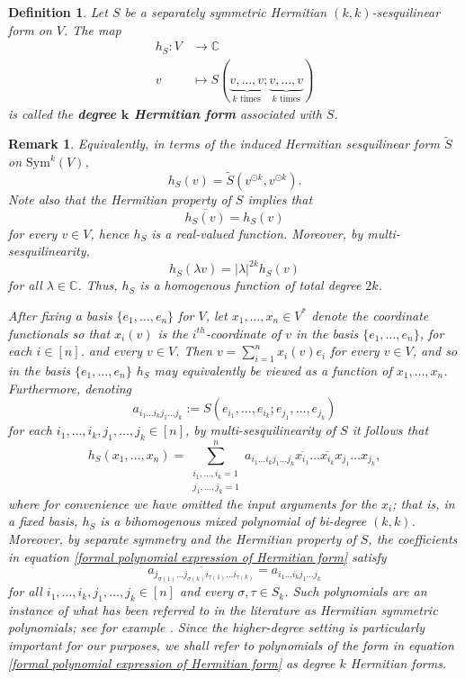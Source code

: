\documentclass[11pt]{article}
\newtheorem{defn}[theorem]{Definition}
\newtheorem{remark}[theorem]{Remark}
\begin{document}
\begin{defn}
    Let $S$ be a separately symmetric Hermitian $(k,k)$-sesquilinear form on $V$. The map 
    \begin{align*}
        h_S:V&\longrightarrow \mathbb{C} \\
        v&\mapsto S(\underbrace{v,\dots,v}_{k\text{ times}};\underbrace{v,\dots,v}_{k\text{ times}})
    \end{align*}
    is called the \textbf{degree $\boldsymbol{k}$ Hermitian form} associated with $S$. 
\end{defn}
\begin{remark}\label{Properties of Degree k Hermitian Forms}
    Equivalently, in terms of the induced Hermitian sesquilinear form $\widetilde{S}$ on $\mathrm{Sym}^k(V)$, 
    \[h_S(v) = \widetilde{S}(v^{\odot k},v^{\odot k}).\]
    Note also that the Hermitian property of $S$ implies that 
    \[\overline{h_S(v)} = h_S(v)\]
    for every $v\in V$, hence $h_S$ is a real-valued function. Moreover, by multi-sesquilinearity, 
    \[h_S(\lambda v) = |\lambda|^{2k}h_S(v)\]
    for all $\lambda\in \mathbb{C}$. Thus, $h_S$ is a homogenous function of total degree $2k$. 

    After fixing a basis $\{e_1,\dots,e_n\}$ for $V$, let $x_1,\dots,x_n\in V^*$ denote the coordinate functionals so that $x_i(v)$ is the $i^{th}$-coordinate of $v$ in the basis $\{e_1,\dots,e_n\}$, for each $i\in [n]$. and every $v\in V$. Then $v = \sum\limits_{i=1}^nx_i(v)e_i$ for every $v\in V$, and so in the basis $\{e_1,\dots,e_n\}$ $h_S$ may equivalently be viewed as a function of $x_1,\dots,x_n$. Furthermore, denoting
    \[a_{i_1\dots i_k j_1\dots j_k} := S(e_{i_1},\dots,e_{i_k};e_{j_1},\dots,e_{j_k})\]
    for each $i_1,\dots,i_k,j_1,\dots,j_k\in [n]$, by multi-sesquilinearity of $S$ it follows that 
    \begin{equation}\label{formal polynomial expression of Hermitian form}
        h_S(x_1,\dots,x_n) = \sum\limits_{\substack{i_1,\dots,i_k=1 \\ j_1,\dots,j_k=1}}^na_{i_1\dots i_k j_1\dots j_k}\overline{x_{i_1}}\dots \overline{x_{i_k}}x_{j_1}\dots x_{j_k},
    \end{equation}
    where for convenience we have omitted the input arguments for the $x_i$; that is, in a fixed basis, $h_S$ is a bihomogenous mixed polynomial of bi-degree $(k,k)$. Moreover, by separate symmetry and the Hermitian property of $S$, the coefficients in equation \eqref{formal polynomial expression of Hermitian form} satisfy 
    \[\overline{a_{j_{\sigma(1)}\dots j_{\sigma(k)}i_{\tau(1)}\dots i_{\tau(k)}}} = a_{i_1\dots i_k j_1\dots j_k}\]
    for all $i_1,\dots,i_k,j_1,\dots,j_k\in [n]$ and every $\sigma,\tau\in S_k$. Such polynomials are an instance of what has been referred to in the literature as Hermitian symmetric polynomials; see for example \cite{d2011hermitian}. Since the higher-degree setting is particularly important for our purposes, we shall refer to polynomials of the form in equation \eqref{formal polynomial expression of Hermitian form} as degree $k$ Hermitian forms. 
\end{remark}
\end{document}
